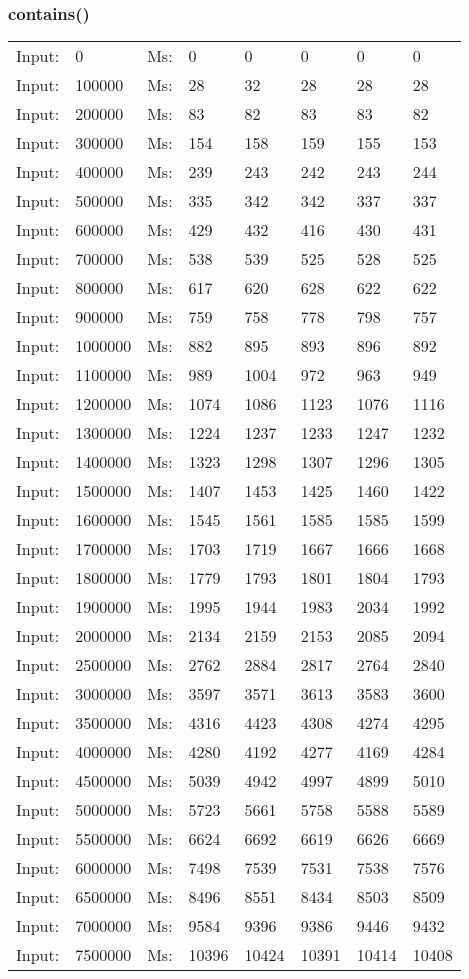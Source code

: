 \documentclass[11pt,a4paper]{report}
\begin{document}
\begin{tiny}
\subsubsection*{contains()}
\begin{tabular}{l l ||l  l  l  l  l  l}
Input:&0&Ms:&0&0&0&0&0\\
Input:&100000&Ms:&28&32&28&28&28\\
Input:&200000&Ms:&83&82&83&83&82\\
Input:&300000&Ms:&154&158&159&155&153\\
Input:&400000&Ms:&239&243&242&243&244\\
Input:&500000&Ms:&335&342&342&337&337\\
Input:&600000&Ms:&429&432&416&430&431\\
Input:&700000&Ms:&538&539&525&528&525\\
Input:&800000&Ms:&617&620&628&622&622\\
Input:&900000&Ms:&759&758&778&798&757\\
Input:&1000000&Ms:&882&895&893&896&892\\
Input:&1100000&Ms:&989&1004&972&963&949\\
Input:&1200000&Ms:&1074&1086&1123&1076&1116\\
Input:&1300000&Ms:&1224&1237&1233&1247&1232\\
Input:&1400000&Ms:&1323&1298&1307&1296&1305\\
Input:&1500000&Ms:&1407&1453&1425&1460&1422\\
Input:&1600000&Ms:&1545&1561&1585&1585&1599\\
Input:&1700000&Ms:&1703&1719&1667&1666&1668\\
Input:&1800000&Ms:&1779&1793&1801&1804&1793\\
Input:&1900000&Ms:&1995&1944&1983&2034&1992\\
Input:&2000000&Ms:&2134&2159&2153&2085&2094\\
Input:&2500000&Ms:&2762&2884&2817&2764&2840\\
Input:&3000000&Ms:&3597&3571&3613&3583&3600\\
Input:&3500000&Ms:&4316&4423&4308&4274&4295\\
Input:&4000000&Ms:&4280&4192&4277&4169&4284\\
Input:&4500000&Ms:&5039&4942&4997&4899&5010\\
Input:&5000000&Ms:&5723&5661&5758&5588&5589\\
Input:&5500000&Ms:&6624&6692&6619&6626&6669\\
Input:&6000000&Ms:&7498&7539&7531&7538&7576\\
Input:&6500000&Ms:&8496&8551&8434&8503&8509\\
Input:&7000000&Ms:&9584&9396&9386&9446&9432\\
Input:&7500000&Ms:&10396&10424&10391&10414&10408\\
\end{tabular}


\end{tiny}
\end{document}

